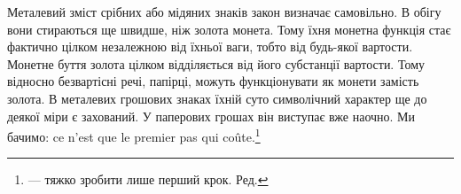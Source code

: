 Металевий зміст срібних або мідяних знаків закон визначає
самовільно. В обігу вони стираються ще швидше, ніж золота
монета. Тому їхня монетна функція стає фактично цілком незалежною
від їхньої ваги, тобто від будь-якої вартости. Монетне
буття золота цілком відділяється від його субстанції вартости.
Тому відносно безвартісні речі, папірці, можуть функціонувати
як монети замість золота. В металевих грошових знаках їхній
суто символічний характер ще до деякої міри є захований. У паперових
грошах він виступає вже наочно. Ми бачимо: ce n’est que
le premier pas qui coûte.\footnote*{
— тяжко зробити лише перший крок. Ред.
}
